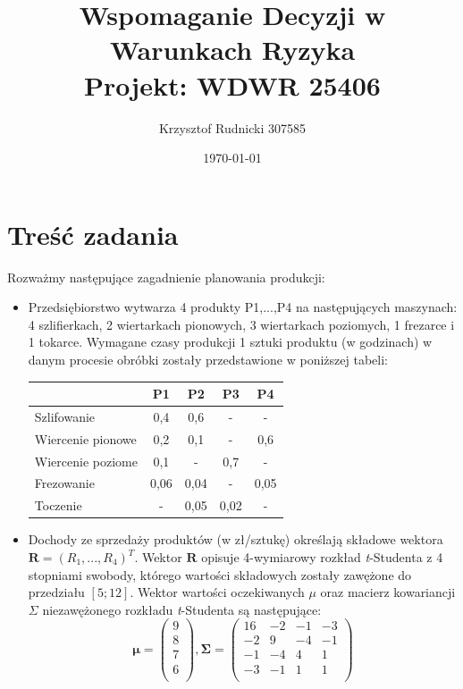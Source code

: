 \documentclass[11pt,a4paper]{article}
\title{Wspomaganie Decyzji w Warunkach Ryzyka\\\large \medskip Projekt: WDWR 25406\\}
\author{Krzysztof Rudnicki 307585}
\date{\today}
\begin{document}
\maketitle

\section*{Treść zadania}
Rozważmy następujące zagadnienie planowania produkcji:

\begin{itemize}
  \item Przedsiębiorstwo wytwarza 4 produkty P1,...,P4 na następujących maszynach: 4 szlifierkach, 2 wiertarkach pionowych, 3 wiertarkach poziomych, 1 frezarce i 1 tokarce. Wymagane czasy produkcji 1 sztuki produktu (w godzinach) w danym procesie obróbki zostały przedstawione w poniższej tabeli:\\
  \begin{center}
  \begin{tabular}{l*{4}{c}}
  	\hline
              			& P1 & P2 & P3 & P4 \\
	\hline
	Szlifowanie 		& 0,4 & 0,6 & - & - \\
	Wiercenie pionowe   & 0,2 & 0,1 & - & 0,6 \\
	Wiercenie poziome 	& 0,1 & - & 0,7 & -  \\
	Frezowanie  	 	& 0,06 & 0,04 & - & 0,05 \\
	Toczenie	     	& - & 0,05 & 0,02 & - \\
	\hline
	\end{tabular}
	\end{center}

  \item Dochody ze sprzedaży produktów (w zł/sztukę) określają składowe wektora $\mathbf{R} = (R_{1},...,R_{4})^{T}$. Wektor $\mathbf{R}$ opisuje 4-wymiarowy rozkład \textit{t}-Studenta z 4 stopniami swobody, którego wartości składowych zostały zawężone do przedziału $[5;12]$. Wektor wartości oczekiwanych $\mu$ oraz macierz kowariancji $\Sigma$ niezawężonego rozkładu \textit{t}-Studenta są następujące:
  \begin{displaymath}
\mathbf{\mu} = 
 \begin{pmatrix}
  9 \\ 8 \\ 7 \\ 6 \\  
 \end{pmatrix},
 \mathbf{\Sigma} = 
 \begin{pmatrix}
  16 & -2 & -1 & -3 \\
  -2 & 9 & -4 & -1 \\ 
  -1 & -4 & 4 & 1 \\
  -3 & -1 & 1 & 1 \\  
 \end{pmatrix}
  \end{displaymath}
  

\end{itemize}
\end{document}
